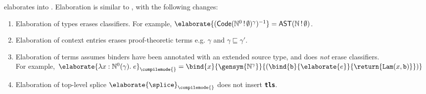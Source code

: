 \recLang{} elaborates into \recCoreLang{}. Elaboration is similar to , with the following changes:
\begin{enumerate}
  \item Elaboration of types erases classifiers. For example,  $\elaborate{(\textsf{Code}(\mathbb{N}^{0} \, ! \, \emptyset)^{\gamma})^{-1}} = \mathbb{\textsf{AST}(\mathbb{N \, ! \, \emptyset})}$.
  \item Elaboration of context entries erases proof-theoretic terms e.g. $\gamma$ and $\gamma \sqsubseteq \gamma'$.
  \item Elaboration of terms assumes binders have been annotated with an extended source type, and does \textit{not} erase classifiers. \\
  For example, $\elaborate{\lambda x: {\mathbb{N}^0({\gamma})}. \; e}_{\compilemode{}} = \bind{x}{\gensym{\mathbb{N}^{\gamma}}}{(\bind{\texttt{b}}{\elaborate{e}}{\return{\texttt{Lam}(x, \texttt{b})}})}$
  \item Elaboration of top-level splice $\elaborate{\splice}_{\compilemode{}}$ does not insert \textbf{\texttt{tls}}.
\end{enumerate}


